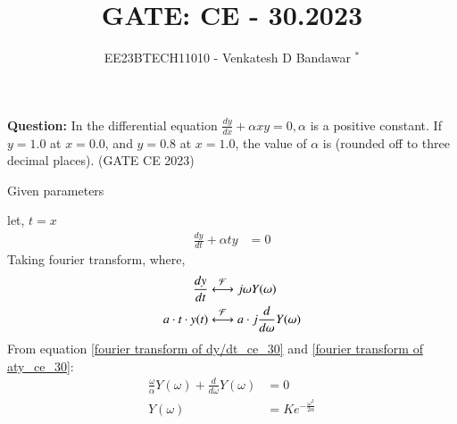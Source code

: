 \documentclass[journal,12pt,twocolumn]{IEEEtran}
\theoremstyle{remark}
\begin{document}

\vspace{3cm}

\title{GATE: CE - 30.2023}
\author{EE23BTECH11010 - Venkatesh D Bandawar $^{*}$%
}
\maketitle
\bigskip


\textbf{Question:} In the differential equation $\frac{dy}{dx} + \alpha x y = 0, \alpha$ is a positive constant. If $y = 1.0$ at
$x = 0.0$, and $y = 0.8$ at $x = 1.0$, the value of $\alpha$ is (rounded off to three decimal places).  \hfill(GATE CE 2023)

\solution
\begin{table}[!h] 
\centering

\caption{Given parameters}
\label{given parameters list.gate.ce.30}
\end{table}



let, $t=x$
\begin{align}
    \frac{dy}{dt} + \alpha t y &= 0
\end{align}
Taking fourier transform,
where,
\begin{align}
    \frac{dy}{dt} & \system{\mathcal{F}} j\omega Y(\omega) \label{fourier transform of dy/dt_ce_30}\\
    a \cdot t \cdot y(t) & \system{\mathcal{F}} a \cdot j \frac{d}{d\omega} Y(\omega)\label{fourier transform of aty_ce_30}
\end{align}
From equation \eqref{fourier transform of dy/dt_ce_30} and \eqref{fourier transform of aty_ce_30}:
\begin{align}
    \frac{\omega}{\alpha} Y(\omega) + \frac{d}{d\omega} Y(\omega) &= 0\\
    Y(\omega) &= K e^{-\frac{\omega^2}{2\alpha} }
\end{align}
\end{document}
